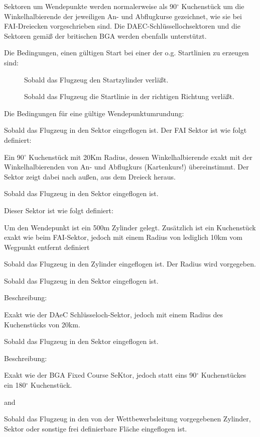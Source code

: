  Sektoren um Wendepunkte werden normalerweise als 90$^\circ$ Kuchenstück um die Winkelhalbierende der jeweiligen An- und Abflugkurse gezeichnet, wie sie bei FAI-Dreiecken vorgeschrieben sind.
 Die DAEC-Schlüssellochsektoren und die Sektoren gemäß der britischen BGA werden ebenfalls unterstützt.

Die Bedingungen, einen gültigen Start bei einer der o.g. Startlinien zu erzeugen sind:
\begin{description}
\item[] Sobald das Flugzeug den Startzylinder verläßt.
\item[] Sobald das Flugzeug die Startlinie in der richtigen Richtung verläßt.
\end{description}

Die Bedingungen für eine gültige Wendepunktumrundung:
\begin{description}
\item[\p{FAI-Sektor}] Sobald das Flugzeug in den Sektor eingeflogen ist. Der FAI Sektor ist wie folgt definiert:

    Ein 90$^\circ$ Kuchenstück mit 20Km Radius, dessen Winkelhalbierende exakt mit der Winkelhalbierenden von An- und Abflugkurs (Kartenkurs!) übereinstimmt. Der Sektor zeigt dabei nach außen, aus dem Dreieck heraus.
\item[\p{Schlüsselloch (DAeC 0.5/10 Sektor)}] Sobald das Flugzeug in den Sektor eingeflogen ist.

    Dieser Sektor ist wie folgt definiert:

    Um den Wendepunkt ist ein 500m Zylinder gelegt. Zusätzlich  ist ein Kuchenstück exakt wie beim FAI-Sektor, jedoch mit einem Radius von lediglich  10km vom Wegpunkt entfernt definiert
\item[\p{Wendepunkt Zylinder}]  Sobald das Flugzeug in den Zylinder eingeflogen ist. Der Radius wird vorgegeben.

\item[\p{BGA Fixed Course Sector}]  Sobald das Flugzeug in den Sektor eingeflogen ist.

Beschreibung:

Exakt wie der DAeC Schlüsseloch-Sektor, jedoch mit einem Radius des Kuchenstücks von 20km.
\item[\p{BGA Enhanced Option Fixed Course Sector}]   Sobald das Flugzeug in den Sektor eingeflogen ist.

Beschreibung:

Exakt wie der BGA Fixed Course SeKtor, jedoch statt eins 90$^\circ$ Kuchenstückes ein 180$^\circ$  Kuchenstück.
\item[\p{Area Zylinder (AAT)}]  and
\item[\p{Area Sektor (AAT)}]  Sobald das Flugzeug in den von der Wettbewerbsleitung vorgegebenen Zylinder, Sektor oder sonstige frei definierbare Fläche eingeflogen ist.
\end{description}

